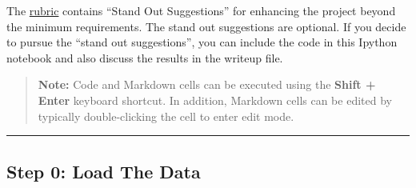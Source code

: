 \documentclass[11pt]{article}
\begin{document}
The \href{https://review.udacity.com/\#!/rubrics/481/view}{rubric}
contains ``Stand Out Suggestions'' for enhancing the project beyond the
minimum requirements. The stand out suggestions are optional. If you
decide to pursue the ``stand out suggestions'', you can include the code
in this Ipython notebook and also discuss the results in the writeup
file.

\begin{quote}
\textbf{Note:} Code and Markdown cells can be executed using the
\textbf{Shift + Enter} keyboard shortcut. In addition, Markdown cells
can be edited by typically double-clicking the cell to enter edit mode.
\end{quote}

    \begin{center}\rule{0.5\linewidth}{\linethickness}\end{center}

\hypertarget{step-0-load-the-data}{%
\subsection{Step 0: Load The Data}\label{step-0-load-the-data}}
\end{document}
